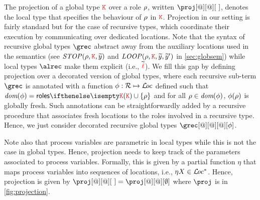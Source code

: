 The projection of a global type $\aK$ over a role $\rho$, 
written $\proj[@][@][\ ]$,  denotes the local type that specifies 
the behaviour of  $\rho$ in $\aK$. 
% 
Projection in our setting is fairly standard but for the case of
recursive types,  which coordinate their execution by communicating 
over dedicated locations.
%
Note that the syntax of recursive global types $\grec$ abstract away from 
the auxiliary locations used in the semantics  (see 
 $\mathit{STOP}(\arole, \aK, \seq y)$ and
 $\mathit{LOOP}(\arole, \aK, \seq y, \seq y')$ in \cref{sec:globsem}) while 
local types $\alrec$ make them explicit (i.e., $\widetilde{{\color{red}\ell}}$). 
We fill this gap by defining projection over a
decorated version of global types, where 
each recursive sub-term $\grec$ is annotated with a function
$\phi:\mathcal{R} \mapsto \mathcal{L}\!\mathit{oc}$
 defined such that $\dom\aphi = \roles\aK\cup\{\arole\}$ and 
 for all $\rho\in\textit{dom}(\phi)$,  $\phi(\rho)$ is globally fresh.
 Such annotations can be  straightforwardly added by a recursive 
 procedure that associates fresh locations to the roles involved in a 
 recursive type.  Hence, we just consider decorated recursive global types
 $\grec[@][@][@][\aphi]$. 

 Note also that process variables are parametric in local types while this is 
 not the case in global types. Hence, projection needs to keep
 track of the parameters associated to process 
 variables. Formally, this is given by a partial function $\eta$ that maps process variables into sequences of locations, i.e., 
 $\eta X \in\mathcal{L}\!\mathit{oc}^*$. Hence, projection is given by  $\proj[@][@][\ ] = \proj[@][@][\emptyset]$ where $\proj$
is in \cref{fig:projection}.
 
